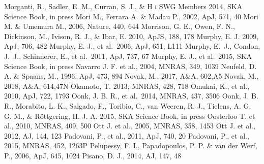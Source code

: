 \begin{thebibliography}{99}
\begin{multicols}{2}
{
    	Morganti, R., Sadler, E. M., Curran, S. J., \& H \textsc{i} SWG Members
    	2014, SKA Science Book, in press
	Mori M., Ferrara A. \& Madau P., 2002, ApJ, 571, 40
	Mori M. \& Umemura M., 2006, Nature, 440, 644
    	Morrison, G. E., Owen, F. N., Dickinson, M., Ivison, R. J., \& Ibar, E. 2010, ApJS, 188, 178
    	Murphy, E. J. 2009, ApJ, 706, 482
    	Murphy, E. J., et al.\ 2006, ApJ, 651, L111
	Murphy, E.~J., Condon, J.~J., Schinnerer, E., et al.\ 2011, ApJ, 737, 67 
    	Murphy, E. J., et al.\ 2015, SKA Science Book, in press
	Navarro J. F. et al., 2004, MNRAS, 349, 1039
     	Neufeld, D. A. \& Spaans, M., 1996, ApJ, 473, 894
    Novak, M., 2017, A\&A, 602,A5
    Novak, M., 2018, A\&A, 614,47N
   	Okamoto, T. 2013, MNRAS, 428, 718
      Omukai, K., et al., 2010, ApJ, 722, 1793
    	Oonk, J. B. R., et al.\ 2014, MNRAS, 437, 3506
    	Oonk, J. B. R., Morabito, L. K., Salgado, F., Toribio, C., van Weeren, R. J.,
    	Tielens, A. G. G. M., \& R\"{o}ttgering, H. J. A. 2015, SKA Science Book, in press
	Oosterloo T. et al., 2010, MNRAS, 409, 500
	Ott J. et al., 2005, MNRAS, 358, 1453
	Ott J. et al., 2012, AJ, 144, 123
	Padovani, P., et al., 2011, ApJ, 740, 20
	Padovani, P., et al.,  2015, MNRAS, 452, 1263P
	Pelupessy, F. I., Papadopoulos, P. P. \& van der Werf, P., 2006, ApJ, 645, 1024
	Pisano, D. J., 2014, AJ, 147, 48
}
\end{multicols}
\end{thebibliography}
